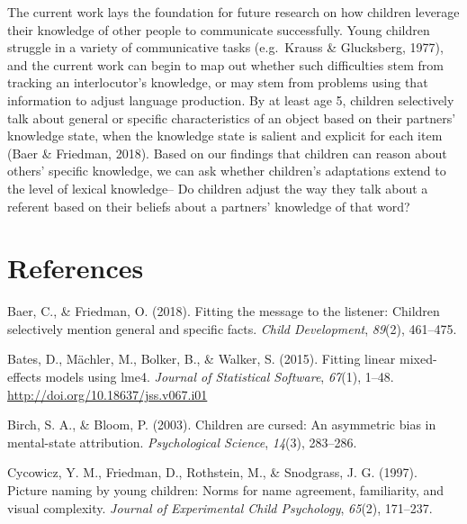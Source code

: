 \documentclass[10pt, letterpaper]{article}
\begin{document}
The current work lays the foundation for future research on how children
leverage their knowledge of other people to communicate successfully.
Young children struggle in a variety of communicative tasks (e.g.~Krauss
\& Glucksberg, 1977), and the current work can begin to map out whether
such difficulties stem from tracking an interlocutor's knowledge, or may
stem from problems using that information to adjust language production.
By at least age 5, children selectively talk about general or specific
characteristics of an object based on their partners' knowledge state,
when the knowledge state is salient and explicit for each item (Baer \&
Friedman, 2018). Based on our findings that children can reason about
others' specific knowledge, we can ask whether children's adaptations
extend to the level of lexical knowledge-- Do children adjust the way
they talk about a referent based on their beliefs about a partners'
knowledge of that word?

\vspace{1em} 

\hypertarget{references}{%
\section{References}\label{references}}

\setlength{\parindent}{-0.1in} 
\setlength{\leftskip}{0.125in}

\noindent

\hypertarget{refs}{}
\leavevmode\hypertarget{ref-baer2018}{}%
Baer, C., \& Friedman, O. (2018). Fitting the message to the listener:
Children selectively mention general and specific facts. \emph{Child
Development}, \emph{89}(2), 461--475.

\leavevmode\hypertarget{ref-bates2015}{}%
Bates, D., Mächler, M., Bolker, B., \& Walker, S. (2015). Fitting linear
mixed-effects models using lme4. \emph{Journal of Statistical Software},
\emph{67}(1), 1--48. \url{http://doi.org/10.18637/jss.v067.i01}

\leavevmode\hypertarget{ref-birch2003}{}%
Birch, S. A., \& Bloom, P. (2003). Children are cursed: An asymmetric
bias in mental-state attribution. \emph{Psychological Science},
\emph{14}(3), 283--286.

\leavevmode\hypertarget{ref-cycowicz1997}{}%
Cycowicz, Y. M., Friedman, D., Rothstein, M., \& Snodgrass, J. G.
(1997). Picture naming by young children: Norms for name agreement,
familiarity, and visual complexity. \emph{Journal of Experimental Child
Psychology}, \emph{65}(2), 171--237.
\end{document}

